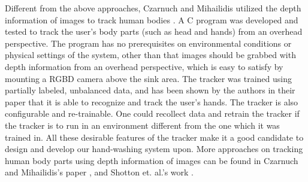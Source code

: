 Different from the above approaches, Czarnuch and Mihailidis utilized the depth information of images to track human bodies \cite{czarnuch2014}. A C program was developed and tested to track the user's body parts (such as head and hands) from an overhead perspective. The program has no prerequisites on environmental conditions or physical settings of the system, other than that images should be grabbed with depth information from an overhead perspective, which is easy to satisfy by mounting a RGBD camera above the sink area. The tracker was trained using partially labeled, unbalanced data, and has been shown by the authors in their paper that it is able to recognize and track the user's hands. The tracker is also configurable and re-trainable. One could recollect data and retrain the tracker if the tracker is to run in an environment different from the one which it was trained in. All these desirable features of the tracker make it a good candidate to design and develop our hand-washing system upon. More approaches on tracking human body parts using depth information of images can be found in Czarnuch and Mihailidis's paper \cite{czarnuch2014}, and Shotton et. al.'s work \cite{shotton2013real}.